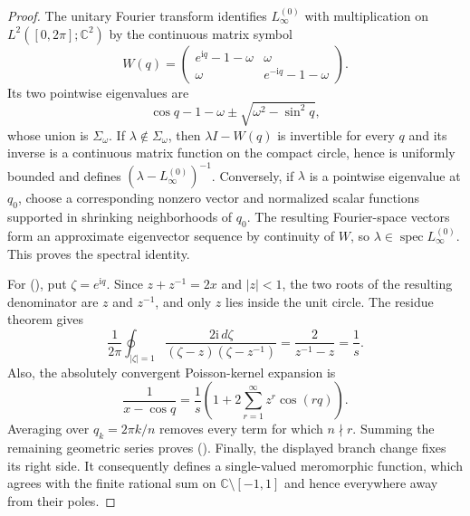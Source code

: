 \documentclass[twoside,10pt]{article}
\numberwithin{equation}{section}
\theoremstyle{slbody}
\theoremstyle{definition}
\theoremstyle{remark}
\newcommand{\C}{\mathbb C}
\newcommand{\ii}{\mathrm i}
\newcommand{\spec}{\operatorname{spec}}
\renewcommand{\eqref}[1]{%
  \textup{{\normalfont(\oldstylenums{\ref{#1}}}\normalfont)}}
\begin{document}
\begin{proof}
The unitary Fourier transform identifies $L_\infty^{(0)}$ with
multiplication on $L^2([0,2\pi];\C^2)$ by the continuous matrix symbol
\[
 W(q)=\begin{pmatrix}
 e^{\ii q}-1-\omega&\omega\\
 \omega&e^{-\ii q}-1-\omega
 \end{pmatrix}.
\]
Its two pointwise eigenvalues are
\[
 \cos q-1-\omega\pm\sqrt{\omega^2-\sin^2q},
\]
whose union is $\Sigma_\omega$.  If $\lambda\notin\Sigma_\omega$,
then $\lambda I-W(q)$ is invertible for every $q$ and its inverse is a
continuous matrix function on the compact circle, hence is uniformly
bounded and defines $(\lambda-L_\infty^{(0)})^{-1}$.  Conversely, if
$\lambda$ is a pointwise eigenvalue at $q_0$, choose a corresponding
nonzero vector and normalized scalar functions supported in shrinking
neighborhoods of $q_0$.  The resulting Fourier-space vectors form an
approximate eigenvector sequence by continuity of $W$, so
$\lambda\in\spec L_\infty^{(0)}$.  This proves the spectral identity.

For \eqref{eq:green-circle-integral}, put $\zeta=e^{\ii q}$.  Since
$z+z^{-1}=2x$ and $|z|<1$, the two roots of the resulting denominator
are $z$ and $z^{-1}$, and only $z$ lies inside the unit circle.  The
residue theorem gives
\[
 \frac1{2\pi}\oint_{|\zeta|=1}
   \frac{2\ii\,d\zeta}{(\zeta-z)(\zeta-z^{-1})}
 =\frac{2}{z^{-1}-z}=\frac1s.
\]
Also, the absolutely convergent Poisson-kernel expansion is
\[
 \frac1{x-\cos q}
 =\frac1s\left(1+2\sum_{r=1}^{\infty}z^r\cos(rq)\right).
\]
Averaging over $q_k=2\pi k/n$ removes every term for which $n\nmid r$.
Summing the remaining geometric series proves
\eqref{eq:green-root-unity}.  Finally, the displayed branch change
fixes its right side.  It consequently defines a single-valued
meromorphic function, which agrees with the finite rational sum on
$\C\setminus[-1,1]$ and hence everywhere away from their poles.
\end{proof}
\end{document}
